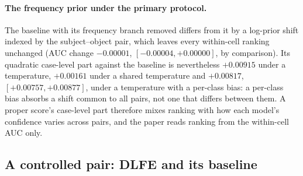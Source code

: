 \paragraph{The frequency prior under the primary protocol.} The baseline with its frequency
branch removed differs from it by a log-prior shift indexed by the subject--object pair, which
leaves every within-cell ranking unchanged (AUC change $-0.00001$, $[-0.00004,+0.00000]$, by
comparison). Its quadratic case-level part against the baseline is nevertheless $+0.00915$
under a temperature, $+0.00161$ under a shared temperature and $+0.00817$,
$[+0.00757,+0.00877]$, under a temperature with a per-class bias: a per-class bias absorbs a
shift common to all pairs, not one that differs between them. A proper score's case-level part
therefore mixes ranking with how each model's confidence varies across pairs, and the paper
reads ranking from the within-cell AUC only.

\begin{table}[t]
\centering
\scriptsize
\setlength\tabcolsep{2pt}
\caption{\textbf{Within-cell AUC change under both weightings}, on all identified relations
and on the audit half; image bootstrap, $1{,}000$ replicates. Lower block: the real-pixel study
(seed 0).}
\label{tab:rankweighting}

\end{table}

\begin{table}[t]
\centering
\footnotesize
\caption{\textbf{Comparison-weighted AUC change by predicate-tier pair} (head: more than
10{,}000 training instances; tail: fewer than 500), with each tier pair's share of the
comparison weight; image bootstrap, $1{,}000$ replicates.}
\label{tab:tierpair}

\end{table}

\begin{table}[t]
\centering
\scriptsize
\setlength\tabcolsep{2pt}
\caption{\textbf{The matched split under three recalibration families}, audit half,
image-clustered intervals. Every family preserves each model's within-cell ranking.}
\label{tab:recalibration}

\end{table}

\subsection{A controlled pair: DLFE and its baseline}\label{app:dlfe}

